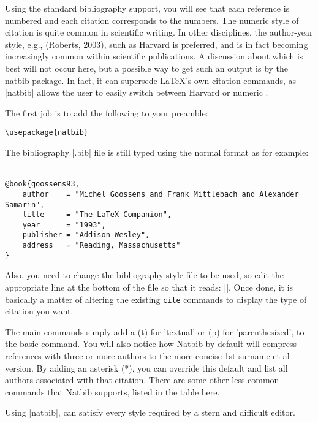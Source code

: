 \begin{refsection}
Using the standard \latex bibliography support, you will see that each reference is numbered and each citation corresponds to the numbers. The numeric style of citation is quite common in scientific writing. In other disciplines, the author-year style, e.g., (Roberts, 2003), such as Harvard is preferred, and is in fact becoming increasingly common within scientific publications. A discussion about which is best will not occur here, but a possible way to get such an output is by the natbib package. In fact, it can supersede LaTeX's own citation commands, as |natbib| allows the user to easily switch between Harvard or numeric  \citep{natbib2009}.


The first job is to add the following to your preamble:

\begin{verbatim}
\usepackage{natbib}
\end{verbatim}


The bibliography |.bib| file is still typed using the normal format as for example:---

\begin{verbatim}
@book{goossens93,
    author    = "Michel Goossens and Frank Mittlebach and Alexander Samarin",
    title     = "The LaTeX Companion",
    year      = "1993",
    publisher = "Addison-Wesley",
    address   = "Reading, Massachusetts"
}
\end{verbatim}



Also, you need to change the bibliography style file to be used, so edit the appropriate line at the bottom of the file so that it reads: ||. Once done, it is basically a matter of altering the existing \texttt{cite} commands to display the type of citation you want.


The main commands simply add a (t)  for 'textual' or (p) for 'parenthesized', to the basic  command. You will also notice how Natbib by default will compress references with three or more authors to the more concise 1st surname et al version. By adding an asterisk (*), you can override this default and list all authors associated with that citation. There are some other less common commands that Natbib supports, listed in the table here.

Using |natbib|, can satisfy every style required by a stern and difficult editor.


\end{refsection}
